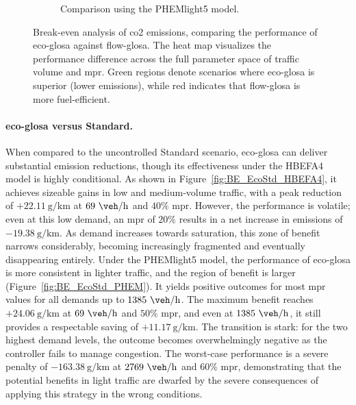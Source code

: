 \begin{figure}[htb]
\begin{subfigure}[b]{0.45\textwidth}
    \caption{Comparison using the PHEMlight5 model.}
    \label{fig:BE_EcoFlow_PHEM}
  \end{subfigure}
  \caption[Break-even CO2 map: Eco-GLOSA vs. Flow-GLOSA]{Break-even analysis of \ac{co2} emissions, comparing the performance of \ac{eco-glosa} against \ac{flow-glosa}. The heat map visualizes the performance difference across the full parameter space of traffic volume and \ac{mpr}. Green regions denote scenarios where \ac{eco-glosa} is superior (lower emissions), while red indicates that \ac{flow-glosa} is more fuel-efficient.}
  \label{fig:BE_EcoFlow}
\end{figure}

\paragraph{\ac{eco-glosa} versus Standard.}
When compared to the uncontrolled Standard scenario, \ac{eco-glosa} can deliver substantial emission reductions, though its effectiveness under the HBEFA4 model is highly conditional. As shown in Figure~\vref{fig:BE_EcoStd_HBEFA4}, it achieves sizeable gains in low and medium-volume traffic, with a peak reduction of $+22.11~\unit{\gram\per\kilo\metre}$ at $69~\unit{\veh\per\hour}$ and $40\%$ \ac{mpr}. However, the performance is volatile; even at this low demand, an \ac{mpr} of $20\%$ results in a net increase in emissions of $-19.38~\unit{\gram\per\kilo\metre}$. As demand increases towards saturation, this zone of benefit narrows considerably, becoming increasingly fragmented and eventually disappearing entirely.
\mynewline
Under the PHEMlight5 model, the performance of \ac{eco-glosa} is more consistent in lighter traffic, and the region of benefit is larger (Figure~\vref{fig:BE_EcoStd_PHEM}). It yields positive outcomes for most \ac{mpr} values for all demands up to $1385~\unit{\veh\per\hour}$. The maximum benefit reaches $+24.06~\unit{\gram\per\kilo\metre}$ at $69~\unit{\veh\per\hour}$ and $50\%$ \ac{mpr}, and even at $1385~\unit{\veh\per\hour}$, it still provides a respectable saving of $+11.17~\unit{\gram\per\kilo\metre}$. The transition is stark: for the two highest demand levels, the outcome becomes overwhelmingly negative as the controller fails to manage congestion. The worst-case performance is a severe penalty of $-163.38~\unit{\gram\per\kilo\metre}$ at $2769~\unit{\veh\per\hour}$ and $60\%$ \ac{mpr}, demonstrating that the potential benefits in light traffic are dwarfed by the severe consequences of applying this strategy in the wrong conditions.

